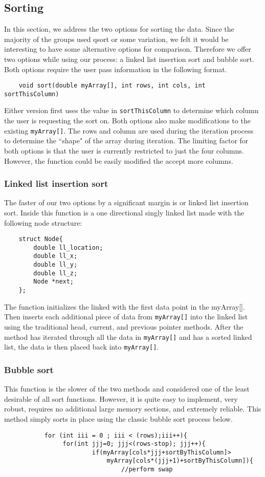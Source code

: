 \documentclass{article}
\begin{document}
\subsection{Sorting}
In this section, we address the two options for sorting the data. Since the majority of the groups used qsort or some variation, we felt it would be interesting to have some alternative options for comparison. Therefore we offer two options while using our process: a linked list insertion sort and bubble sort. Both options require the user pass information in the following format. 
\begin{lstlisting}
	void sort(double myArray[], int rows, int cols, int sortThisColumn)
\end{lstlisting}
Either version first uses the value in \texttt{sortThisColumn} to determine which column the user is requesting the sort on. Both options also make modifications to the existing \texttt{myArray[]}. The rows and column are used during the iteration process to determine the ``shape" of the array during iteration. The limiting factor for both options is that the user is currently restricted to just the four columns. However, the function could be easily modified the accept more columns.

\subsubsection{Linked list insertion sort}
The faster of our two options by a significant margin is or linked list insertion sort. Inside this function is a one directional singly linked list made with the following node structure:
\begin{lstlisting}
	struct Node{
		double ll_location;
		double ll_x;
		double ll_y;
		double ll_z;
		Node *next;
	};
\end{lstlisting}

The function initializes the linked with the first data point in the myArray[]. Then inserts each additional piece of data from \texttt{myArray[]} into the linked list using the traditional head, current, and previous pointer methods. After the method has iterated through all the data in \texttt{myArray[]} and has a sorted linked list, the data is then placed back into \texttt{myArray[]}.

\subsubsection{Bubble sort}
This function is the slower of the two methods and considered one of the least desirable of all sort functions. However, it is quite easy to implement, very robust, requires no additional large memory sections, and extremely reliable. This method simply sorts in place using the classic bubble sort process below.
\begin{lstlisting}
           for (int iii = 0 ; iii < (rows);iii++){
		        for(int jjj=0; jjj<(rows-stop); jjj++){
			            if(myArray[cols*jjj+sortByThisColumn]>
			                myArray[cols*(jjj+1)+sortByThisColumn]){
				                //perform swap
\end{lstlisting}
\end{document}

